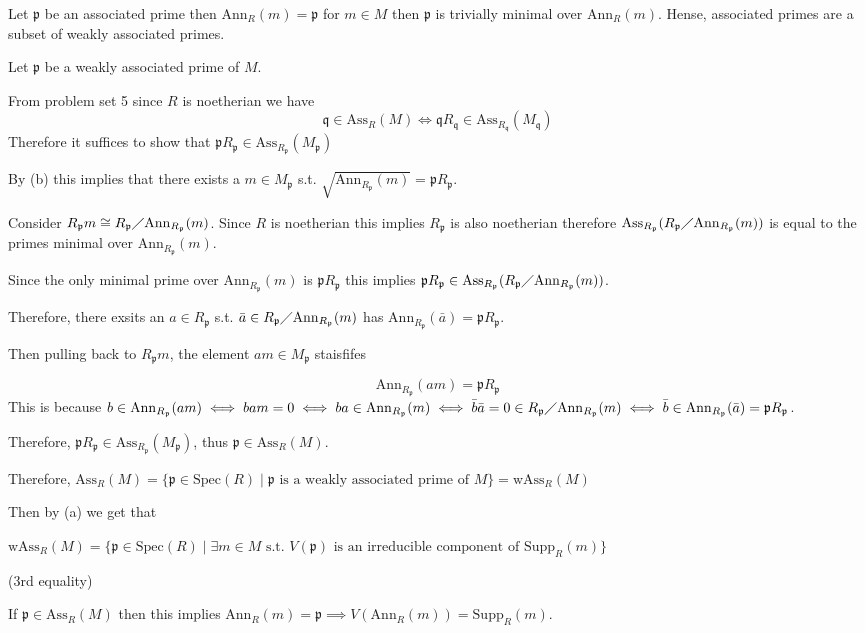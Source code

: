 \documentclass[12pt, letterpaper]{article}
\newcommand{\p}{\mathfrak{p}}
\renewcommand{\t}[1]{\text{#1}}
\newcommand{\Spec}{\mathrm{Spec}}
\newcommand{\Ass}{\mathrm{Ass}}
\newcommand{\Supp}{\mathrm{Supp}}
\newcommand{\Ann}{\mathrm{Ann}}
\newcommand{\mf}[1]{\mathfrak{#1}}
\begin{document}
\begin{subproblem}{}
    
\end{subproblem}
\begin{problemproof}
    Let $\p$ be an associated prime then $\Ann_R(m)=\p$ for $m \in M$ then $\p$ is trivially minimal over $\Ann_R(m)$. Hense, associated primes are a subset of weakly associated primes.

    Let $\p$ be a weakly associated prime of $M$.

    From problem set 5 since $R$ is noetherian we have 
    \[\mf{q} \in \Ass_R(M) \iff \mf{q} R_{\mf{q}} \in \Ass_{R_\mf{q}}(M_\mf{q})\]
    Therefore it suffices to show that $\p R_\p \in \Ass_{R_\p}(M_\p)$

    By (b) this implies that there exists a $m \in M_\p$ s.t. $\sqrt{\Ann_{R_\p}(m)} = \p R_\p$.

    Consider $R_\p m \cong R_\p \diagup \Ann_{R_\p}(m)$. Since $R$ is noetherian this implies $R_\p$ is also noetherian therefore $\Ass_{R_\p}(R_\p \diagup \Ann_{R_\p}(m))$ is equal to the primes minimal over $\Ann_{R_{\p}}(m)$.

    Since the only minimal prime over $\Ann_{R_\p}(m)$ is $\p R_\p$ this implies $\p R_\p \in \Ass_{R_\p}(R_\p \diagup \Ann_{R_\p}(m))$.

    Therefore, there exsits an $a \in R_\p$ s.t. $\bar{a} \in R_\p \diagup \Ann_{R_\p}(m)$ has $\Ann_{R_\p}(\bar{a})=\p R_\p$.

    Then pulling back to $R_\p m$, the element $am \in M_\p$ staisfifes

    \[\Ann_{R_\p}(am) = \p R_\p\]
    This is because $b \in \Ann_{R_\p}(am) \iff bam = 0 \iff ba \in \Ann_{R_\p}(m) \iff \bar{b}\bar{a} = 0 \in R_\p \diagup \Ann_{R_\p}(m) \iff \bar{b} \in \Ann_{R_\p}(\bar{a})= \p R_\p$.

    Therefore, $\p R_\p \in \Ass_{R_\p}(M_\p)$, thus $\p \in \Ass_R(M)$.

    Therefore, $\Ass_R(M)=\{\p \in \Spec(R) \mid \p \t{ is a weakly associated prime of } M\}=\mathrm{wAss}_R(M)$

    Then by (a) we get that 
    
    $\mathrm{wAss}_R(M)=\{\p \in \Spec(R) \mid \exists m \in M \t{ s.t. } V(\p) \t{ is an irreducible component of } \Supp_R(m)\}$

    (3rd equality)

    If $\p \in \Ass_R(M)$ then this implies $\Ann_R(m)=\p \implies V(\Ann_R(m))=\Supp_R(m)$.


\end{problemproof}
\end{document}
